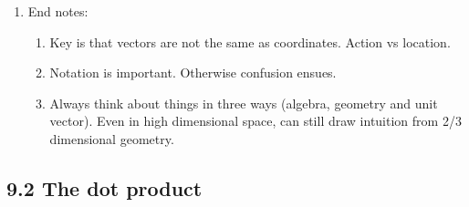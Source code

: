 \documentclass{article}
\begin{document}
\begin{enumerate}
\item End notes:
\begin{enumerate}
\item Key is that vectors are not the same as coordinates. Action vs location.
\item Notation is important. Otherwise confusion ensues.
\item Always think about things in three ways (algebra, geometry and unit vector). Even in high dimensional space, can still draw intuition from 2/3 dimensional geometry.
\end{enumerate}
\end{enumerate}


\subsection{9.2 The dot product}
\end{document}
